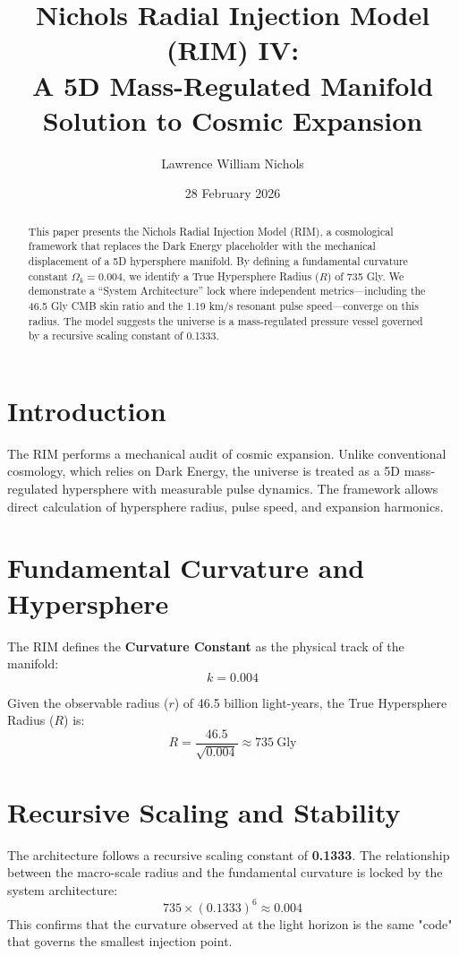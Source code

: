\documentclass[11pt,a4paper]{article}
\title{\textbf{Nichols Radial Injection Model (RIM) IV:\\
A 5D Mass-Regulated Manifold Solution to Cosmic Expansion}}
\author{Lawrence William Nichols}
\date{28 February 2026}
\begin{document}
\maketitle

\begin{abstract}
This paper presents the Nichols Radial Injection Model (RIM), a cosmological framework that replaces the Dark Energy placeholder with the mechanical displacement of a 5D hypersphere manifold. By defining a fundamental curvature constant $\Omega_k = 0.004$, we identify a True Hypersphere Radius ($R$) of 735 Gly. We demonstrate a ``System Architecture'' lock where independent metrics—including the 46.5 Gly CMB skin ratio and the 1.19 km/s resonant pulse speed—converge on this radius. The model suggests the universe is a mass-regulated pressure vessel governed by a recursive scaling constant of 0.1333.
\end{abstract}

\section{Introduction}
The RIM performs a mechanical audit of cosmic expansion. Unlike conventional cosmology, which relies on Dark Energy, the universe is treated as a 5D mass-regulated hypersphere with measurable pulse dynamics. The framework allows direct calculation of hypersphere radius, pulse speed, and expansion harmonics.

\section{Fundamental Curvature and Hypersphere}
The RIM defines the \textbf{Curvature Constant} as the physical track of the manifold:
\begin{equation}
k = 0.004
\end{equation}

Given the observable radius ($r$) of 46.5 billion light-years, the True Hypersphere Radius ($R$) is:
\begin{equation}
R = \frac{46.5}{\sqrt{0.004}} \approx 735 \ \text{Gly}
\end{equation}

\section{Recursive Scaling and Stability}
The architecture follows a recursive scaling constant of \textbf{0.1333}. The relationship between the macro-scale radius and the fundamental curvature is locked by the system architecture:
\begin{equation}
735 \times (0.1333)^6 \approx 0.004
\end{equation}
This confirms that the curvature observed at the light horizon is the same "code" that governs the smallest injection point.
\end{document}

